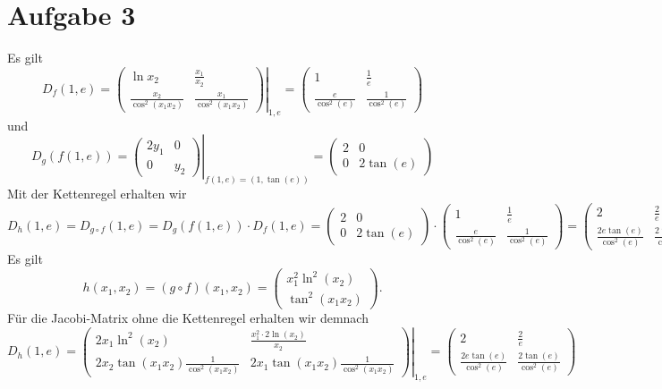 \documentclass{article}
\theoremstyle{definition}
\begin{document}
\section*{Aufgabe 3}
Es gilt 
\[
	D_f(1,e) = \left.\begin{pmatrix}
		\ln x_2 & \frac{x_1}{x_2}\\[0.2em]
		\frac{x_2}{\cos^2(x_1x_2)}& \frac{x_1}{\cos^2(x_1x_2)}
	\end{pmatrix}\right|_{1,e} = \begin{pmatrix}
		1 & \frac{1}{e}\\[0.2em]
		\frac{e}{\cos^2(e)} & \frac{1}{\cos^2(e)}
	\end{pmatrix}
\] und 
\[
	D_g(f(1,e)) = \left.\begin{pmatrix}
		2y_1 & 0\\0& y_2
	\end{pmatrix} \right|_{f(1,e) = (1, \tan(e))} = \begin{pmatrix}
		2 & 0\\ 0 & 2 \tan(e)
	\end{pmatrix}
\]
Mit der Kettenregel erhalten wir 
\[
	D_h(1,e) = D_{g \circ f}(1,e) = D_g(f(1,e)) \cdot D_f(1,e) = \begin{pmatrix}
		2 & 0\\ 0 &2 \tan(e)
	\end{pmatrix} \cdot \begin{pmatrix}
		1 & \frac{1}{e}\\[0.2em]
		\frac{e}{\cos^2(e)} & \frac{1}{\cos^2(e)}
	\end{pmatrix} = \begin{pmatrix}
		2 & \frac{2}{e}\\[0.2em]
		\frac{2 e\tan(e)}{\cos^2(e)} & \frac{2 \tan(e)}{\cos^2(e)}
	\end{pmatrix}
\]
Es gilt \[h(x_1, x_2) = (g \circ f) (x_1,x_2) = \begin{pmatrix}
	x_1^2\ln^2(x_2)\\\tan^2(x_1x_2)
\end{pmatrix}.\] Für die Jacobi-Matrix ohne die Kettenregel erhalten wir demnach
\[
	D_h(1,e) = \left.\begin{pmatrix}
		2x_1\ln^2(x_2) & \frac{x_1^2\cdot 2\ln(x_2)}{x_2}\\[0.2em]
		2x_2\tan(x_1x_2)\frac{1}{\cos^2(x_1x_2)} & 2 x_1 \tan(x_1x_2)\frac{1}{\cos^2(x_1x_2)}
	\end{pmatrix}\right|_{1,e} = \begin{pmatrix}
		2 & \frac{2}{e}\\[0.2em]
		\frac{2e\tan(e)}{\cos^2(e)} & \frac{2\tan(e)}{\cos^2(e)}
	\end{pmatrix}
\]
\end{document}

